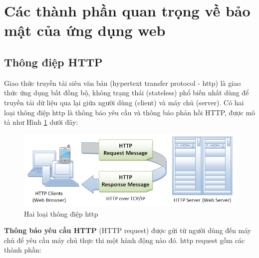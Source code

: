 \section{Các thành phần quan trọng về bảo mật của ứng dụng web}
\subsection[Thông điệp HTTP]{Thông điệp HTTP}
Giao thức truyền tải siêu văn bản (hypertext transfer protocol - \acrshort{http}) là giao thức ứng dụng bất đồng bộ, không trạng thái (stateless) phổ biến nhất dùng để truyền tải dữ liệu qua lại giữa người dùng (client) và máy chủ (server). Có hai loại thông điệp \acrshort{http} là thông báo yêu cầu và thông báo phản hồi HTTP, được mô tả như Hình \ref{fig:http} dưới đây:
\begin{figure}[H]
  \centering
    \includegraphics[width=\textwidth,keepaspectratio=true]{images/http.png}
  \caption[Hai loại thông điệp HTTP]{Hai loại thông điệp \acrshort{http}\protect\footnotemark}
  \label{fig:http}
\end{figure}
\textbf{Thông báo yêu cầu HTTP} (HTTP request) được gửi từ người dùng đến máy chủ để yêu cầu máy chủ thực thi một hành động nào đó. \acrshort{http} request gồm các thành phần:
